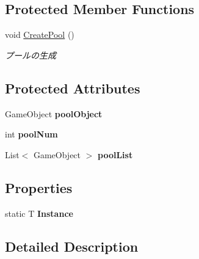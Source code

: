 \subsection*{Protected Member Functions}
\begin{DoxyCompactItemize}
\item 
void \hyperlink{class_singleton_object_pool_base_a31f837eb2f5bafd9e7b3b275f39329a6}{Create\+Pool} ()
\begin{DoxyCompactList}\small\item\em プールの生成 \end{DoxyCompactList}\end{DoxyCompactItemize}
\subsection*{Protected Attributes}
\begin{DoxyCompactItemize}
\item 
Game\+Object {\bfseries pool\+Object}\hypertarget{class_singleton_object_pool_base_a2a95e2e9ebbee11165f3f13b31b866ec}{}\label{class_singleton_object_pool_base_a2a95e2e9ebbee11165f3f13b31b866ec}

\item 
int {\bfseries pool\+Num}\hypertarget{class_singleton_object_pool_base_a876763d012019bbd0beee30e65df03af}{}\label{class_singleton_object_pool_base_a876763d012019bbd0beee30e65df03af}

\item 
List$<$ Game\+Object $>$ {\bfseries pool\+List}\hypertarget{class_singleton_object_pool_base_a877383a71dc7b4327c5462e7d5807ded}{}\label{class_singleton_object_pool_base_a877383a71dc7b4327c5462e7d5807ded}

\end{DoxyCompactItemize}
\subsection*{Properties}
\begin{DoxyCompactItemize}
\item 
static T {\bfseries Instance}\hypertarget{class_singleton_object_pool_base_ab906d15c93813acbd1ac4f58da2c9b6a}{}\label{class_singleton_object_pool_base_ab906d15c93813acbd1ac4f58da2c9b6a}

\end{DoxyCompactItemize}


\subsection{Detailed Description}



